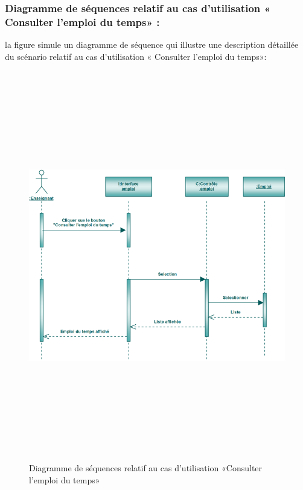 \documentclass[12 pt ]{report}
\begin{document}
\subsubsection{Diagramme de séquences relatif au cas d’utilisation « Consulter l'emploi du temps» :}
la figure   simule un diagramme de séquence qui illustre une description détaillée du scénario relatif au cas d’utilisation « Consulter l'emploi du temps»: 
\begin{figure}[h]
 \begin{center}
\includegraphics[width= 18 cm ,height=  17cm]{sce.PNG}
\caption{Diagramme de séquences relatif au cas d’utilisation «Consulter l'emploi du temps»}

\end{center}
\end{figure}
\end{document}
